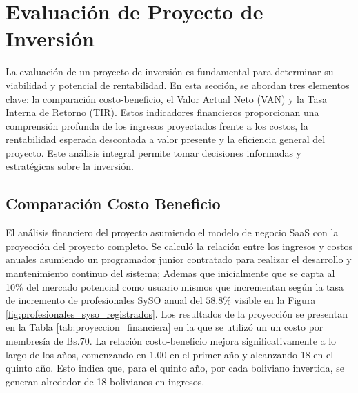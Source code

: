 \section{Evaluación de Proyecto de Inversión}
La evaluación de un proyecto de inversión es fundamental para determinar su viabilidad y potencial de rentabilidad. En esta sección, se abordan tres elementos clave: la comparación costo-beneficio, el Valor Actual Neto (VAN) y la Tasa Interna de Retorno (TIR). Estos indicadores financieros proporcionan una comprensión profunda de los ingresos proyectados frente a los costos, la rentabilidad esperada descontada a valor presente y la eficiencia general del proyecto. Este análisis integral permite tomar decisiones informadas y estratégicas sobre la inversión.

\subsection{Comparación Costo Beneficio}

El análisis financiero del proyecto asumiendo el modelo de negocio SaaS con la proyección del proyecto completo. Se calculó la relación entre los ingresos y costos anuales asumiendo un programador junior contratado para realizar el desarrollo y mantenimiento continuo del sistema; Ademas que inicialmente que se capta al 10\% del mercado potencial como usuario mismos que incrementan según la tasa de incremento de profesionales SySO anual del $58.8\%$ visible en la Figura \ref{fig:profesionales_syso_registrados}. Los resultados de la proyección se presentan en la Tabla \ref{tab:proyeccion_financiera} en la que se utilizó un un costo por membresía de Bs.70. La relación costo-beneficio mejora significativamente a lo largo de los años, comenzando en 1.00 en el primer año y alcanzando 18 en el quinto año. Esto indica que, para el quinto año, por cada boliviano invertida, se generan alrededor de 18 bolivianos en ingresos.

